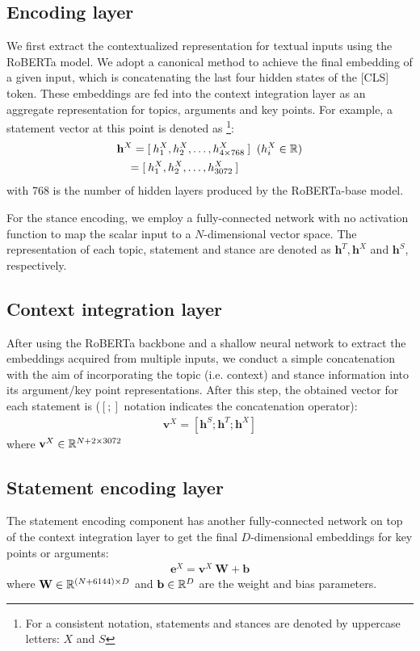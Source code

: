 \subsection{Encoding layer}

We first extract the contextualized representation for textual inputs using the RoBERTa \citep{liu2019roberta} model. We adopt a canonical method \citep{sun2019fine} to achieve the final embedding of a given input, which is concatenating the last four hidden states of the [CLS] token. These embeddings are fed into the context integration layer as an aggregate representation for topics, arguments and key points. For example, a statement vector at this point is denoted as \footnote{For a consistent notation, statements and stances are denoted by uppercase letters: $X$ and $S$}: 
\begin{align*}
\mathbf{h}^X = [\:h^X_1, h^X_2, \dots, h^X_{4\times768}\:]\;\; (h^X_i \in \R ) \\
    = [\:h^X_1, h^X_2, \dots, h^X_{3072}\:] \hspace*{20mm}
\end{align*}
with 768 is the number of hidden layers produced by the RoBERTa-base model. 

For the stance encoding, we employ a fully-connected network with no activation function to map the scalar input to a $N$-dimensional vector space. The representation of each topic, statement and stance are denoted as $\mathbf{h}^T, \mathbf{h}^X$ and $\mathbf{h}^S$, respectively.

\subsection{Context integration layer}

After using the RoBERTa backbone and a shallow neural network to extract the embeddings acquired from multiple inputs, we conduct a simple concatenation with the aim of incorporating the topic (i.e. context) and stance information into its argument/key point representations. After this step, the obtained vector for each statement is ($[;]$ notation indicates the concatenation operator):
\begin{align*}
\mathbf{v}^X = [\mathbf{h}^S; \mathbf{h}^T; \mathbf{h}^X] 
\end{align*}
where $\mathbf{v}^X \in \mathbb{R}^{N+2\times3072}$

\subsection{Statement encoding layer}
The statement encoding component has another fully-connected network on top of the context integration layer to get the final $D$-dimensional embeddings for key points or arguments:
\begin{align*}
\mathbf{e}^X = \mathbf{v}^X\:\mathbf{W} + \mathbf{b}
\end{align*}
where $\mathbf{W} \in \mathbb{R}^{ (N+6144) \times D}$ and $ \mathbf{b} \in \mathbb{R}^{D}$ are the weight and bias parameters.

